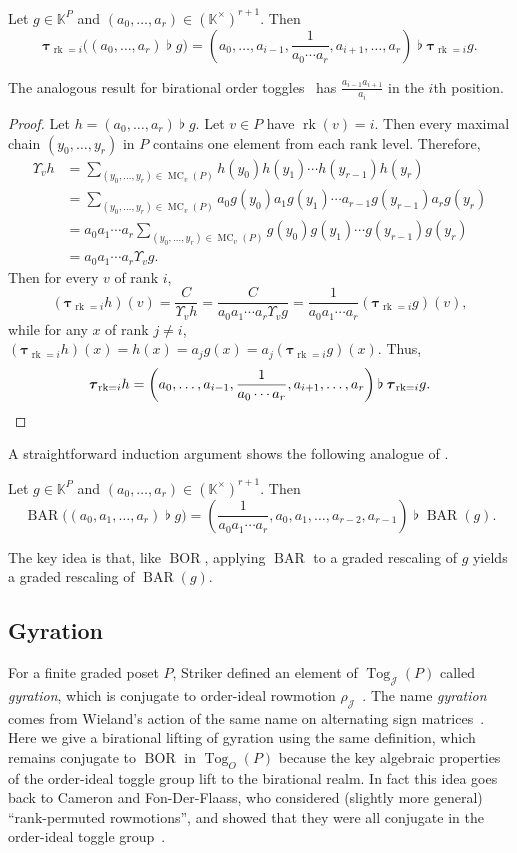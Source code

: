 \documentclass[ALCO,ThmDefs,Unicode,epreuves]{cedram}
\newcommand{\kk}{\mathbb{K}}
\DeclareMathOperator{\tog}{Tog}
\DeclareMathOperator{\mc}{MC}
\DeclareMathOperator{\rk}{rk}
\DeclareMathOperator{\BAR}{BAR}
\DeclareMathOperator{\BOR}{BOR}
\newcommand{\rktau}[1]{\boldsymbol{\tau}_{\rk=#1}}
\newcommand{\flatbin}{\mathbin{\flat}}
\newcommand{\calj}{\mathcal{J}}
\newcommand\rowm{\rho}
\newcommand\rowJ{\rowm_{\mathcal{J}}}
\newcommand{\ds}{}
\begin{document}
\begin{prop}\label{prop:rank-tog-graded-rescaling}
Let $g\in\kk^P$ and $(a_0,\dots,a_r)\in(\kk^\times)^{r+1}$.
Then
\[
\rktau{i}\big( (a_0,\dots,a_r)\flatbin g \big)=
\left( a_0,\dots,a_{i-1},\frac{1}{a_0\cdots a_r},a_{i+1},\dots,a_r \right) \flatbin\rktau{i}g.
\]
\end{prop}
The analogous result for birational order toggles~\cite[Prop.~39]{GrRo16} has 
$\ds \frac{a_{i-1}a_{i+1}}{a_{i}}$ in the $i$th position. 
\begin{proof}
Let $h=(a_0,\dots,a_r)\flatbin g$. Let $v\in P$ have $\rk(v)=i$. Then every maximal chain
$(y_0,\dots,y_r)$ in $P$ contains one element from each rank level. Therefore, 
\begin{align*}
\Upsilon_v h &= \sum\limits_{(y_0,\dots,y_r)\in\mc_v(P)} h(y_0)h(y_1)\cdots h(y_{r-1}) h(y_r)\\
&= \sum\limits_{(y_0,\dots,y_r)\in\mc_v(P)} a_0 g(y_0) a_1 g(y_1)\cdots a_{r-1} g(y_{r-1}) a_r g(y_r)\\
&= a_0a_1\cdots a_r \sum\limits_{(y_0,\dots,y_r)\in\mc_v(P)} g(y_0) g(y_1)\cdots g(y_{r-1}) g(y_r)\\
&= a_0a_1\cdots a_r \Upsilon_v g.
\end{align*}
Then for every $v$ of rank $i$,
\[
(\rktau{i}h)(v)=\frac{C}{\Upsilon_v h}=\frac{C}{a_0a_1\cdots a_r \Upsilon_v g}
=\frac{1}{a_0a_1\cdots a_r}(\rktau{i}g)(v),
\] 
while for any $x$ of rank $j\not=i$,
$(\rktau{i}h)(x)=h(x)=a_j g(x) = a_j (\rktau{i}g)(x)$.
Thus, 
\[
\rktau{i}h = \left( a_0,\dots,a_{i-1},\frac{1}{a_0\cdots a_r},a_{i+1},\dots,a_r \right) \flatbin \rktau{i}g.\qedhere
\]
\end{proof}
A straightforward induction argument shows the following analogue of
\cite[Prop.~40]{GrRo16}. 
\begin{prop}\label{prop:BAR-graded-rescaling}
Let $g\in\kk^P$ and $(a_0,\dots,a_r)\in(\kk^\times)^{r+1}$.
Then
\[
\BAR\big( (a_0,a_1, \dots,a_r)\flatbin g \big)=
\left( \frac{1}{a_0 a_1\cdots a_r}, a_0, a_1, \dots, a_{r-2}, a_{r-1} \right) \flatbin\BAR(g).
\]
\end{prop}

The key idea is that, like $\BOR$, applying $\BAR$ to a graded rescaling of $g$ yields a graded
rescaling of $\BAR(g)$. 

\subsection{Gyration}

For a finite graded poset $P$, Striker defined an
element of $\tog_\calj(P)$ called \emph{gyration},
which is conjugate to order-ideal rowmotion
$\rowJ$~\cite[\S~6]{strikerRS}.
The name \emph{gyration} comes from Wieland's action of the same name on alternating sign matrices~\cite{wieland}. 
Here we give a birational lifting of gyration using the
same definition, which remains conjugate to
$\BOR$ in $\tog_O(P)$ because the key algebraic properties of the order-ideal toggle group lift
to the birational realm. In fact this idea goes back to Cameron and Fon-Der-Flaass,
who considered (slightly more general) ``rank-permuted rowmotions'', and showed that they
were all conjugate in the order-ideal toggle group~\cite[Lemma 2]{cameronfonder}.
\end{document}
